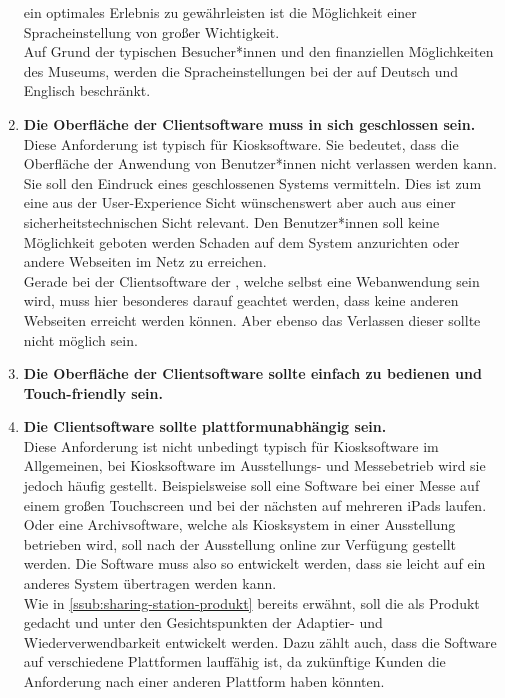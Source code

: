 \begin{enumerate}[label=\textbf{NFA\arabic*}]
  ein optimales Erlebnis zu gewährleisten ist die Möglichkeit einer Spracheinstellung von großer Wichtigkeit.\\
  Auf Grund der typischen Besucher*innen und den finanziellen Möglichkeiten des Museums, werden die 
  Spracheinstellungen bei der \shst{} auf Deutsch und Englisch beschränkt.
  \item\label{nfa4} \textbf{Die Oberfläche der Clientsoftware muss in sich geschlossen sein.}\\
  Diese Anforderung ist typisch für Kiosksoftware. Sie bedeutet, dass die Oberfläche der Anwendung von Benutzer*innen 
  nicht verlassen werden kann. Sie soll den Eindruck eines geschlossenen Systems vermitteln. Dies ist zum eine
  aus der User-Experience Sicht wünschenswert aber auch aus einer sicherheitstechnischen Sicht relevant. Den 
  Benutzer*innen soll keine Möglichkeit geboten werden Schaden auf dem System anzurichten oder andere Webseiten
  im Netz zu erreichen.\\
  Gerade bei der Clientsoftware der \shst{}, welche selbst eine Webanwendung sein wird, muss hier besonderes darauf
  geachtet werden, dass keine anderen Webseiten erreicht werden können. Aber ebenso das Verlassen dieser sollte
  nicht möglich sein.
  \item\label{nfa5} \textbf{Die Oberfläche der Clientsoftware sollte einfach zu bedienen und Touch-friendly sein.}\\
  \item\label{nfa6} \textbf{Die Clientsoftware sollte plattformunabhängig sein.}\\
  Diese Anforderung ist nicht unbedingt typisch für Kiosksoftware im Allgemeinen, bei Kiosksoftware im Ausstellungs- und
  Messebetrieb wird sie jedoch häufig gestellt. Beispielsweise soll eine Software bei einer Messe auf einem
  großen Touchscreen und bei der nächsten auf mehreren iPads laufen. Oder eine Archivsoftware, welche als Kiosksystem
  in einer Ausstellung betrieben wird, soll nach der Ausstellung online zur Verfügung gestellt werden. Die Software
  muss also so entwickelt werden, dass sie leicht auf ein anderes System übertragen werden kann. \\ 
  Wie in \autoref{ssub:sharing-station-produkt} bereits erwähnt, soll die \shst{} als Produkt gedacht und
  unter den Gesichtspunkten der Adaptier- und Wiederverwendbarkeit entwickelt werden. Dazu zählt auch, dass die Software
  auf verschiedene Plattformen lauffähig ist, da zukünftige Kunden die Anforderung nach einer anderen Plattform
  haben könnten. 

\end{enumerate}
